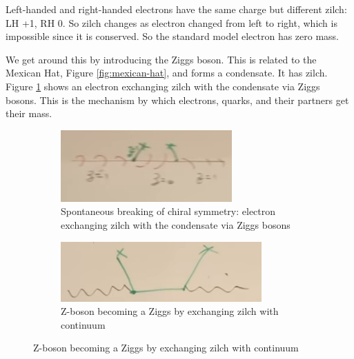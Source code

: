 \documentclass[]{article}
\begin{document}
\begin{appendices}
\begin{figure}[H]
\begin{subfigure}[t]{0.3\textwidth}
		\end{subfigure}	
	\end{figure} 

	Left-handed and right-handed electrons have the same charge but different zilch: LH +1, RH 0. So zilch changes as electron changed from left to right, which is impossible since it is conserved. So the standard model electron has zero mass.
	
	We get around this by introducing the Ziggs boson. This is related to the Mexican Hat, Figure \ref{fig:mexican-hat}, and forms a condensate. It has zilch. Figure \ref{fig:2-a3-zilch} shows an electron exchanging zilch with the condensate via Ziggs bosons. This is the mechanism by which electrons, quarks, and their partners get their mass.
	
	\begin{figure}[H]
		\caption{Spontaneous breaking of chiral symmetry}
		\begin{subfigure}[t]{0.4\textwidth}
			\caption{Spontaneous breaking of chiral symmetry: electron exchanging zilch with the condensate via Ziggs bosons}\label{fig:2-a3-zilch}
			\includegraphics[width=\textwidth]{2-a3-zilch}
		\end{subfigure}
		\begin{subfigure}[t]{0.4\textwidth}
			\caption{Z-boson becoming a Ziggs by exchanging zilch with continuum}\label{fig:2-a3-zilch-Z}
			\includegraphics[width=\textwidth]{2-a3-zilch-Z}
		\end{subfigure}
	\end{figure}
	

\end{appendices}
\end{document}
